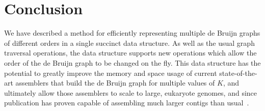 \section{Conclusion}\label{sec:conclusion}

We have described a method for efficiently representing multiple de Bruijn graphs 
of different orders in a single succinct data structure. As well as the usual graph 
traversal operations, the data structure supports new operations which allow the order 
of the de Bruijn graph to be changed on the fly. This data structure has the potential 
to greatly improve the memory and space usage of current state-of-the-art assemblers 
that build the de Bruijn graph for multiple values of $K$, and ultimately allow those
assemblers to scale to large, eukaryote genomes, and since publication has proven capable
of assembling much larger contigs than usual~\cite{Dia18, Dia19}.
